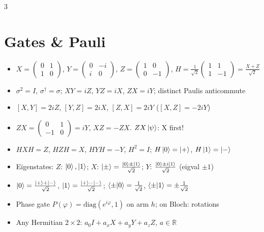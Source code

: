 \documentclass[10pt]{article}
\newcommand{\trap}{\textcolor{red!70!black}}   %
\newcommand{\pp}{\ket{+}}
\newcommand{\mm}{\ket{-}}
\begin{document}
\begin{multicols*}{3}
\section{Gates \& Pauli}
\begin{itemize}
  \item $X\!=\!\begin{pmatrix}0&1\\1&0\end{pmatrix}$, $Y\!=\!\begin{pmatrix}0&-i\\i&0\end{pmatrix}$, $Z\!=\!\begin{pmatrix}1&0\\0&-1\end{pmatrix}$, $H\!=\!\tfrac{1}{\sqrt2}\begin{pmatrix}1&1\\1&-1\end{pmatrix}\!=\!\tfrac{X+Z}{\sqrt2}$ 
  \item $\sigma^2=I$, $\sigma^\dagger=\sigma$; $XY=iZ$, $YZ=iX$, $ZX=iY$; distinct Paulis anticommute
  \item $[X,Y]=2iZ$, $[Y,Z]=2iX$, $[Z,X]=2iY$ ($[X,Z]=-2iY$)
  \item $ZX=\begin{pmatrix}0&1\\-1&0\end{pmatrix}=iY$, $XZ=-ZX$. \trap{$ZX\ket\psi$: X first!}
  \item $HXH=Z$, $HZH=X$, $HYH=-Y$, $H^2=I$; $H\ket{0}=\pp$, $H\ket{1}=\mm$
  \item Eigenstates: $Z$: $\ket0,\ket1$; $X$: $\ket\pm=\tfrac{\ket0\pm\ket1}{\sqrt2}$; $Y$: $\tfrac{\ket0\pm i\ket1}{\sqrt2}$ (eigval $\pm1$)
  \item $\ket{0}=\tfrac{\pp+\mm}{\sqrt2}$, $\ket1=\tfrac{\pp-\mm}{\sqrt2}$; $\braket{\pm}{0}=\tfrac1{\sqrt2}$, $\braket{\pm}{1}=\pm\tfrac1{\sqrt2}$
  \item Phase gate $P(\varphi)=\mathrm{diag}(e^{i\varphi},1)$ on arm $h$; on Bloch: rotations
  \item Any Hermitian $2\times2$: $a_0I+a_xX+a_yY+a_zZ$, $a\in\mathbb R$
\end{itemize}


\end{multicols*}
\end{document}
